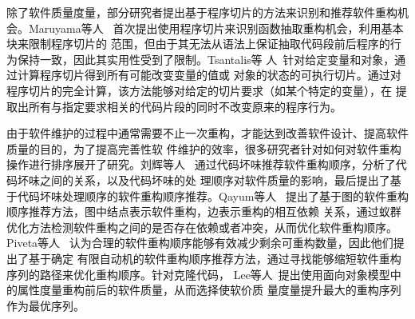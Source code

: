 除了软件质量度量，部分研究者提出基于程序切片的方法来识别和推荐软件重构机会。Maruyama等人
~\cite{maruyama2001automated}首次提出使用程序切片来识别函数抽取重构机会，利用基本块来限制程序切片的
范围，但由于其无法从语法上保证抽取代码段前后程序的行为保持一致，因此其实用性受到了限制。Tsantalis等
人~\cite{tsantalis2011identification}针对给定变量和对象，通过计算程序切片得到所有可能改变变量的值或
对象的状态的可执行切片。通过对程序切片的完全计算，该方法能够对给定的切片要求（如某个特定的变量），在
提取出所有与指定要求相关的代码片段的同时不改变原来的程序行为。

由于软件维护的过程中通常需要不止一次重构，才能达到改善软件设计、提高软件质量的目的，为了提高完善性软
件维护的效率，很多研究者针对如何对软件重构操作进行排序展开了研究。刘辉等人
~\cite{liu2009facilitating}通过代码坏味推荐软件重构顺序，分析了代码坏味之间的关系，以及代码坏味的处
理顺序对软件质量的影响，最后提出了基于代码坏味处理顺序的软件重构顺序推荐。Qayum等人
~\cite{qayum2009local}提出了基于图的软件重构顺序推荐方法，图中结点表示软件重构，边表示重构的相互依赖
关系，通过蚁群优化方法检测软件重构之间的是否存在依赖或者冲突，从而优化软件重构顺序。Piveta等人
~\cite{piveta2008searching}认为合理的软件重构顺序能够有效减少剩余可重构数量，因此他们提出了基于确定
有限自动机的软件重构顺序推荐方法，通过寻找能够缩短软件重构序列的路径来优化重构顺序。针对克隆代码，
Lee等人~\cite{lee2011automated}提出使用面向对象模型中的属性度量重构前后的软件质量，从而选择使软价质
量度量提升最大的重构序列作为最优序列。
